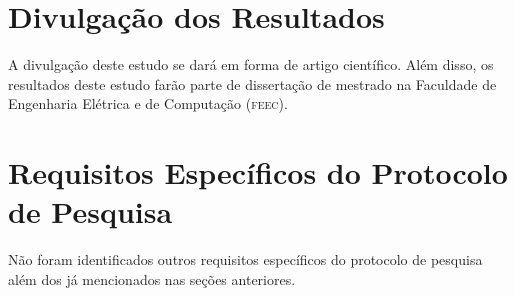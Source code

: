 \documentclass[a4paper,11pt,titlepage,singlespacing]{article}
\begin{document}
\section{Divulgação dos Resultados}
A divulgação deste estudo se dará em forma de artigo científico. Além disso, os resultados deste estudo farão parte de dissertação de mestrado na Faculdade de Engenharia Elétrica e de Computação (\textsc{feec}).

\section{Requisitos Específicos do Protocolo de Pesquisa}
Não foram identificados outros requisitos específicos do protocolo de pesquisa além dos já mencionados nas seções anteriores.






\newpage
{}

\end{document}
